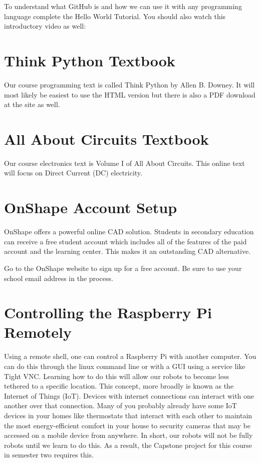 \documentclass[
]{book}
\begin{document}
To understand what GitHub is and how we can use it with any programming language complete the Hello World Tutorial. You should also watch this introductory video as well:

\hypertarget{think-python-textbook}{%
\section{Think Python Textbook}\label{think-python-textbook}}

Our course programming text is called Think Python by Allen B. Downey. It will most likely be easiest to use the HTML version but there is also a PDF download at the site as well.

\hypertarget{all-about-circuits-textbook}{%
\section{All About Circuits Textbook}\label{all-about-circuits-textbook}}

Our course electronics text is Volume I of All About Circuits. This online text will focus on Direct Current (DC) electricity.

\hypertarget{onshape-account-setup}{%
\section{OnShape Account Setup}\label{onshape-account-setup}}

OnShape offers a powerful online CAD solution. Students in secondary education can receive a free student account which includes all of the features of the paid account and the learning center. This makes it an outstanding CAD alternative.

Go to the OnShape website to sign up for a free account. Be sure to use your school email address in the process.

\hypertarget{controlling-the-raspberry-pi-remotely}{%
\section{Controlling the Raspberry Pi Remotely}\label{controlling-the-raspberry-pi-remotely}}

Using a remote shell, one can control a Raspberry Pi with another computer. You can do this through the linux command line or with a GUI using a service like Tight VNC. Learning how to do this will allow our robots to become less tethered to a specific location. This concept, more broadly is known as the Internet of Things (IoT). Devices with internet connections can interact with one another over that connection. Many of you probably already have some IoT devices in your homes like thermostats that interact with each other to maintain the most energy-efficient comfort in your house to security cameras that may be accessed on a mobile device from anywhere. In short, our robots will not be fully robots until we learn to do this. As a result, the Capstone project for this course in semester two requires this.
\end{document}
